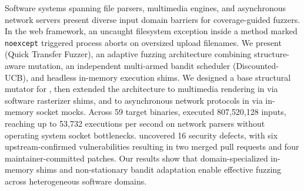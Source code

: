 Software systems spanning file parsers, multimedia engines, and asynchronous network servers present diverse input domain barriers for coverage-guided fuzzers.
In the \drogon web framework, an uncaught filesystem exception inside a method marked \texttt{noexcept} triggered process aborts on oversized upload filenames.
We present \tool (Quick Transfer Fuzzer), an adaptive fuzzing architecture combining structure-aware mutation, an independent multi-armed bandit scheduler (Discounted-UCB), and headless in-memory execution shims.
We designed a base structural mutator for \fastgltf, then extended the architecture to multimedia rendering in \raylib via software rasterizer shims, and to asynchronous network protocols in \drogon via in-memory socket mocks.
Across 59 target binaries, \tool executed 807{,}520{,}128 inputs, reaching up to 53{,}732 executions per second on network parsers without operating system socket bottlenecks.
\tool uncovered 16 security defects, with six upstream-confirmed vulnerabilities resulting in two merged pull requests and four maintainer-committed patches.
Our results show that domain-specialized in-memory shims and non-stationary bandit adaptation enable effective fuzzing across heterogeneous software domains.
